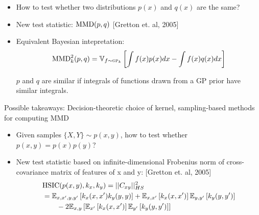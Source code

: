 \documentclass[usenames,dvipsnames]{beamer}
\begin{document}
\begin{frame}[plain, t]
	\titlebodyskip
	

	\slidebody
	{
			\begin{itemize}
				\item How to test whether two distributions $p(x)$ and $q(x)$ are the same?
				\pause
				\item New test statistic:  ${\rm MMD}(p,q)$  [Gretton et. al, 2005]
				\pause
				\item Equivalent Bayesian intepretation:
				 $${\rm MMD}^2_k(p,q) = \mathbb{V}_{f \sim {\textsc{gp}}_k} \left[ {\int f(x) p(x) dx - \int f(x) q(x) dx} \right]$$
				 
				 $p$ and $q$ are similar if integrals of functions drawn from a GP prior have similar integrals.
			\end{itemize}	
	}
			\pause	
	\takeaway%
{
	\vbox{\vspace{0.7in}Possible takeaways:  Decision-theoretic choice of kernel, sampling-based methods for computing MMD
}}	
\end{frame}


\begin{frame}[plain, t]
	\titlebodyskip
	\slidebody
	{
	\begin{itemize}
		\item Given samples $\{X,Y\} \sim p(x,y)$, how to test whether $p(x,y) = p(x)p(y)$?
		\pause
		\item New test statistic based on infinite-dimensional Frobenius norm of cross-covariance matrix of features of x and y: [Gretton et. al, 2005]
		\pause
		\begin{align*}
			& {\rm HSIC}(p(x,y),k_x, k_y) = || C_{xy} ||^2_{HS}  \\
			& = \mathbb{E}_{x, x', y, y'} \left[ {k_x(x,x')k_y(y,y)} \right] + \mathbb{E}_{x, x'} \left[ {k_x(x,x')} \right]\mathbb{E}_{y, y'} \left[ {k_y(y,y')} \right] \\
			& \qquad - 2 \mathbb{E}_{x, y} \left[ {\mathbb{E}_{x'} \left[ {k_x(x,x')} \right]\mathbb{E}_{y'} \left[ {k_y(y,y')} \right]} \right]
		\end{align*}
	\end{itemize}	
	}

\end{frame}	
\end{document}
